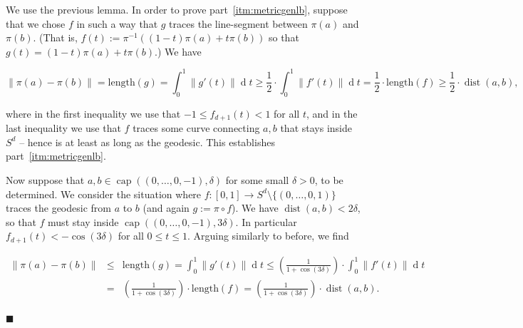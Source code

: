 \documentclass[11pt]{article}%
\newenvironment{proofof}[1]{\vspace{1ex}\noindent{\bf Proof of #1.}}{\hspace*{\fill}$\blacksquare$\vspace{1ex}}
\newcommand{\norm}[1]{\ensuremath{\left\|#1\right\|}}
\DeclareMathOperator{\dist}{dist}
\DeclareMathOperator{\dd}{d}
\DeclareMathOperator{\kap}{cap}
\begin{document}
\begin{proofof}{Lemma~\ref{lem:metric}}
We use the previous lemma.
In order to prove part~\ref{itm:metricgenlb}, suppose that 
we chose $f$ in such a way that $g$ traces the line-segment between $\pi(a)$ and 
$\pi(b)$. (That is, $f(t) := \pi^{-1}\left( (1-t)\pi(a) + t\pi(b) \right)$ so that $g(t) = (1-t)\pi(a) + t\pi(b)$.)
We have 

$$ \norm{\pi(a)-\pi(b)} 
= \text{length}(g) = \int_0^1 \norm{g'(t)}\dd{t}  
\geq \frac12 \cdot \int_0^1 \norm{f'(t)}\dd{t} = \frac12 \cdot \text{length}(f) 
\geq \frac12 \cdot \dist(a,b), $$

\noindent
where in the first inequality we use that $-1 \leq f_{d+1}(t) < 1$ for all $t$, and 
in the last inequality we use that $f$ traces some curve connecting $a,b$ that 
stays inside $S^d$ -- hence is at least as long as the geodesic.
This establishes part~\ref{itm:metricgenlb}.

Now suppose that $a,b \in \kap( (0,\dots,0,-1),\delta)$ for some small $\delta>0$, to be determined.
We consider the situation where $f : [0,1] \to S^d \setminus \{(0,\dots,0,1)\}$ traces 
the geodesic from $a$ to $b$ (and again $g := \pi \circ f$).
We have $\dist(a,b) < 2\delta$, so that $f$ must stay inside $\kap((0,\dots,0,-1),3\delta)$.
In particular $f_{d+1}(t) < -\cos(3\delta)$ for all $0\leq t\leq 1$.
Arguing similarly to before, we find

$$ \begin{array}{rcl} 
\norm{\pi(a)-\pi(b)} 
& \leq & \displaystyle 
\text{length}(g)  = \int_0^1 \norm{g'(t)}\dd{t}  \leq 
\left(\frac{1}{1+\cos(3\delta)}\right) \cdot \int_0^1 \norm{f'(t)}\dd{t} \\[2ex]
& = & \displaystyle 
\left(\frac{1}{1+\cos(3\delta)}\right) \cdot \text{length}(f) =
\left(\frac{1}{1+\cos(3\delta)}\right) \cdot \dist(a,b). 
\end{array} $$


\end{proofof}
\end{document}
